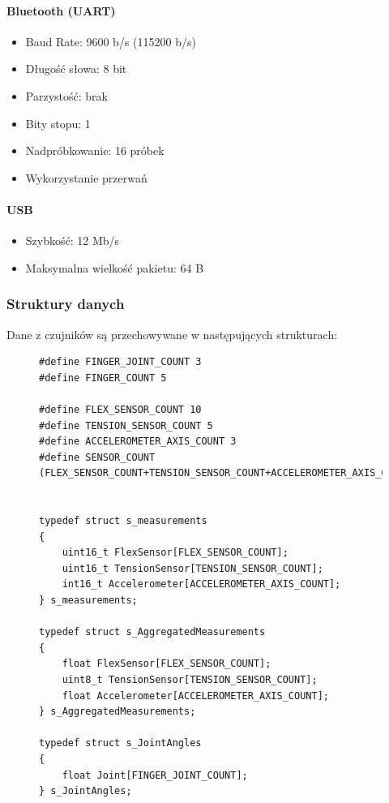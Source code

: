 \documentclass[12pt,a4paper]{article}
\begin{document}
\paragraph{Bluetooth (UART)}
\begin{itemize}
\item Baud Rate: 9600 b/s (115200 b/s)
\item Długość słowa: 8 bit
\item Parzystość: brak
\item Bity stopu: 1
\item Nadpróbkowanie: 16 próbek
\item Wykorzystanie przerwań
\end{itemize}
\paragraph{USB}
\begin{itemize}
\item Szybkość: 12 Mb/s
\item Maksymalna wielkość pakietu: 64 B
\end{itemize}

\subsubsection{Struktury danych}
Dane z czujników są przechowywane w następujących strukturach:
\begin{figure}[!htb]
\begin{lstlisting}[frame=single]
#define FINGER_JOINT_COUNT 3
#define FINGER_COUNT 5

#define FLEX_SENSOR_COUNT 10
#define TENSION_SENSOR_COUNT 5
#define ACCELEROMETER_AXIS_COUNT 3
#define SENSOR_COUNT (FLEX_SENSOR_COUNT+TENSION_SENSOR_COUNT+ACCELEROMETER_AXIS_COUNT)


typedef struct s_measurements
{
	uint16_t FlexSensor[FLEX_SENSOR_COUNT];
	uint16_t TensionSensor[TENSION_SENSOR_COUNT];
	int16_t Accelerometer[ACCELEROMETER_AXIS_COUNT];
} s_measurements;

typedef struct s_AggregatedMeasurements
{
	float FlexSensor[FLEX_SENSOR_COUNT];
	uint8_t TensionSensor[TENSION_SENSOR_COUNT];
	float Accelerometer[ACCELEROMETER_AXIS_COUNT];
} s_AggregatedMeasurements;

typedef struct s_JointAngles
{
	float Joint[FINGER_JOINT_COUNT];
} s_JointAngles;
\end{lstlisting}
\end{figure}

\newpage
\end{document}

